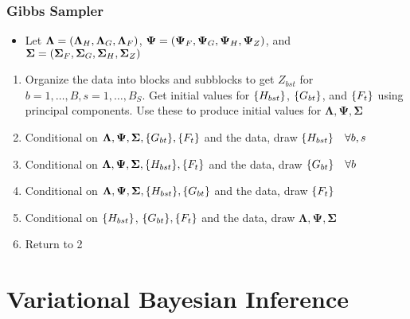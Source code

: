 \documentclass[10pt, compress, notheorems, aspectratio=169]{beamer}
\let\originalleft\left
\let\originalright\right
\renewcommand{\left}{\mathopen{}\mathclose \bgroup \originalleft}
\renewcommand{\right}{\aftergroup \egroup \originalright}
\begin{document}
\begin{frame}
	\frametitle{Gibbs Sampler}
	\begin{itemize}
		\item Let ${\bm \Lambda} = \left( {\bm \Lambda}_H, {\bm \Lambda}_G, {\bm \Lambda}_F \right)$, ${\bm \Psi} = \left( {\bm \Psi}_F, {\bm \Psi}_G, {\bm \Psi}_H, {\bm \Psi}_Z \right)$, and ${\bm \Sigma} = \left( {\bm \Sigma}_F, {\bm \Sigma}_G, {\bm \Sigma}_H, {\bm \Sigma}_Z \right)$
	\end{itemize}
	\begin{enumerate}
		\item Organize the data into blocks and subblocks to get $Z_{bst}$ for $b = 1, \ldots, B, s = 1, \ldots, B_S$. Get initial values for $\left\{ H_{bst} \right\}$, $\left\{ G_{bt} \right\}$,  and $\left\{ F_t \right\}$ using principal components. Use these to produce initial values for ${\bm \Lambda}, {\bm \Psi}, {\bm \Sigma}$
		\item Conditional on ${\bm \Lambda}, {\bm \Psi}, {\bm \Sigma}, \left\{ G_{bt} \right\}, \left\{ F_t \right\}$ and the data, draw $\left\{ H_{bst} \right\} \quad \forall b, s$
		\item Conditional on ${\bm \Lambda}, {\bm \Psi}, {\bm \Sigma}, \left\{ H_{bst} \right\}, \left\{ F_t \right\}$ and the data, draw $\left\{ G_{bt} \right\} \quad \forall b$
		\item Conditional on ${\bm \Lambda}, {\bm \Psi}, {\bm \Sigma}, \left\{ H_{bst} \right\}, \left\{ G_{bt} \right\}$ and the data, draw $\left\{ F_t \right\}$
		\item Conditional on $\left\{ H_{bst} \right\}$, $\left\{ G_{bt} \right\}, \left\{ F_t \right\}$ and the data, draw ${\bm \Lambda}, {\bm \Psi}, {\bm \Sigma}$
		\item Return to 2
	\end{enumerate}
\end{frame}

\section{Variational Bayesian Inference}
\end{document}
